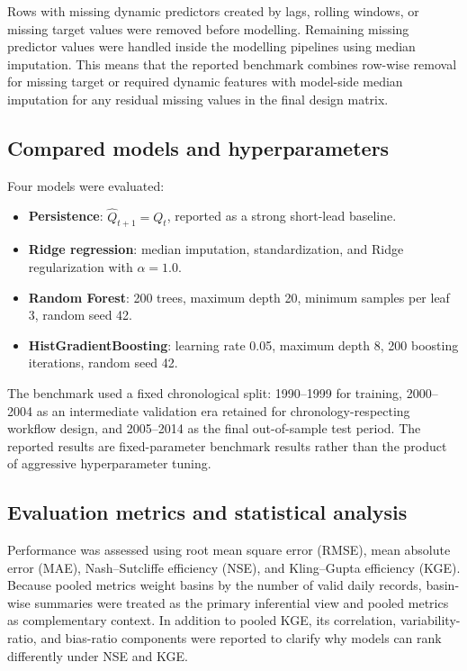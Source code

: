 \documentclass[preprint,12pt,authoryear]{elsarticle}
\begin{document}
Rows with missing dynamic predictors created by lags, rolling windows, or missing target values were removed before modelling. Remaining missing predictor values were handled inside the modelling pipelines using median imputation. This means that the reported benchmark combines row-wise removal for missing target or required dynamic features with model-side median imputation for any residual missing values in the final design matrix.

\subsection{Compared models and hyperparameters}

Four models were evaluated:

\begin{itemize}
\item \textbf{Persistence}: $\hat{Q}_{t+1}=Q_t$, reported as a strong short-lead baseline.
\item \textbf{Ridge regression}: median imputation, standardization, and Ridge regularization with $\alpha=1.0$.
\item \textbf{Random Forest}: 200 trees, maximum depth 20, minimum samples per leaf 3, random seed 42.
\item \textbf{HistGradientBoosting}: learning rate 0.05, maximum depth 8, 200 boosting iterations, random seed 42.
\end{itemize}

The benchmark used a fixed chronological split: 1990--1999 for training, 2000--2004 as an intermediate validation era retained for chronology-respecting workflow design, and 2005--2014 as the final out-of-sample test period. The reported results are fixed-parameter benchmark results rather than the product of aggressive hyperparameter tuning.

\subsection{Evaluation metrics and statistical analysis}

Performance was assessed using root mean square error (RMSE), mean absolute error (MAE), Nash--Sutcliffe efficiency (NSE), and Kling--Gupta efficiency (KGE). Because pooled metrics weight basins by the number of valid daily records, basin-wise summaries were treated as the primary inferential view and pooled metrics as complementary context. In addition to pooled KGE, its correlation, variability-ratio, and bias-ratio components were reported to clarify why models can rank differently under NSE and KGE.
\end{document}
